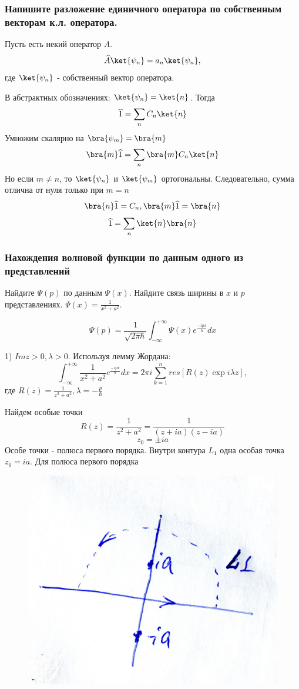 \subsubsection{Напишите разложение единичного оператора по собственным векторам к.л. оператора.}


Пусть есть некий оператор $\widehat{A}$.
$$\widehat{A}\ket{\psi_n} = a_n \ket{\psi_n},$$
где $\ket{\psi_n}$ - собственный вектор оператора.

В абстрактных обозначениях: $\ket{\psi_n} = \ket{n}$. Тогда
$$\widehat{1}=\sum_n C_n \ket{n}$$
Умножим скалярно на $\bra{\psi_m} = \bra{m}$
$$\bra{m} \widehat{1}=\sum_n \bra{m} C_n \ket{n}$$
Но если $m\neq n$, то $\ket{\psi_n}$ и $\ket{\psi_m}$ ортогональны. Следовательно, сумма отлична от нуля только при $m=n$ 
$$\bra{n} \widehat{1}=C_n, \bra{m}\widehat{1}=\bra{n}$$
$$\widehat{1}=\sum_n \ket{n} \bra{n}$$

\subsubsection{Нахождения волновой функции по данным одного из представлений}

Найдите $\Psi(p)$ по данным $\Psi(x)$. Найдите связь ширины в $x$ и $p$ представлениях. $\Psi(x)=\frac{1}{x^2+a^2}$.


$$\Psi(p)=\frac{1}{\sqrt{2\pi \hbar}} \int_{-\infty}^{+\infty} \Psi(x) e^{\frac{-ipx}{\hbar}}dx$$

1) $Im z>0, \lambda >0$. Используя лемму Жордана:
$$\int_{-\infty}^{+\infty} \frac{1}{x^2+a^2} e^{\frac{-ipx}{\hbar}}dx=2\pi i \sum_{k=1}^n res [R(z)\exp{i \lambda z}],$$
где $R(z)=\frac{1}{z^2+a^2}, \lambda=-\frac{p}{\hbar}$ 

Найдем особые точки 
$$R(z)= \frac{1}{z^2+a^2} = \frac{1}{(z+ia)(z-ia)}$$
$$z_0=\pm ia$$
Особе точки - полюса первого порядка. Внутри контура $L_1$ одна особая точка $z_0=ia$. Для полюса первого порядка

\begin{figure}
\includegraphics[width=\linewidth]{fig/fig83}
\caption{}
\vspace{-17pt}
\end{figure}

